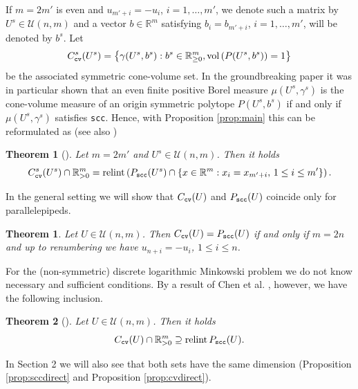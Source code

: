 \documentclass[11pt, a4paper, twoside, reqno]{amsart}
\newcommand{\R}{\mathbb{R}}
\newtheorem{theorem}{Theorem}[section] %
\newtheorem{theoman}{Theorem}[section]
\theoremstyle{definition}
\theoremstyle{remark}
\newcommand{\vol}{\mathrm{vol}\,}
\newcommand{\scc}{{\tt scc}}
\newcommand{\cv}{{\tt cv}}
\DeclareMathOperator{\relint}{relint}
\numberwithin{equation}{section}
\begin{document}
If $m=2m'$ is even and $u_{m'+i }=-u_i$, $i=1,\dots,m'$, we denote such a matrix by $U^s\in \mathcal{U}(n,m)$ and a vector $b\in\R^m$ satisfying $b_i=b_{m'+i}$, $i=1,\dots,m'$, will be denoted by $b^s$. Let 
\begin{equation*}
  C^s_\cv(U^s)=\left\{ \gamma(U^s,b^s) : b^s\in\R^m_{\geq 0}, \vol(P(U^s,b^s))=1\right\}
\end{equation*}
be the associated  symmetric cone-volume set. In the groundbreaking paper \cite{BoeroeczkyLutwakYangEtAl2025} it was in particular shown
that an even finite positive Borel measure $\mu(U^s,\gamma^s)$ is the cone-volume measure of an origin symmetric polytope $P(U^s,b^s)$ if and only if $\mu(U^s,\gamma^s)$ satisfies \scc. Hence, with 
Proposition \ref{prop:main} this can be reformulated as (see also \cite[Thm.~4.7]{LiuSunXiong2024b})
\begin{theoman}[]  Let $m=2m'$ and $U^s\in\mathcal{U}(n,m)$. Then it holds 
  \begin{equation*}
    C^s_\cv(U^s) \cap\R^m_{>0}=\relint \left(P_\scc (U^s) \cap %
    \left\{ x \in \R^m : x_{i } = x_{m'+ i},\,1\leq i\leq m' \right\}\right).
 \end{equation*}    
\label{thm:blyz}  
\end{theoman}


In the general setting we will show that  $C_\cv(U)$ and $P_\scc(U)$ coincide only for parallelepipeds.
\begin{theorem} Let $U\in\mathcal{U}(n,m)$. Then 
  $C_\cv(U)=P_\scc(U)$ if and only if  $m=2n$ and up to renumbering we have
  $u_{n+i}=-u_i$, $1\leq i\leq n$.
\label{thm:equality}  
\end{theorem}
For the (non-symmetric) discrete logarithmic Minkowski problem we do not know necessary and sufficient conditions. 
By a result of Chen et al. \cite{ChenLiZhu2019}, however,  we have the following inclusion.
\begin{theoman}[] Let $U\in\mathcal{U}(n,m)$. Then it holds
  \begin{equation*}
    C_\cv(U)\cap\R^m_{>0} \supseteq \relint P_\scc(U).
  \end{equation*}
  \label{thm:inclusion}
\end{theoman}



In Section 2 we will also see that both sets have the same dimension (Proposition \ref{prop:sccdirect} and Proposition \ref{prop:cvdirect}).
\end{document}
